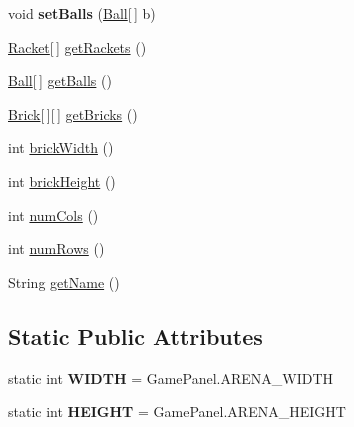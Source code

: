 \begin{DoxyCompactItemize}
\item 
\hypertarget{classbrick_breaker_1_1_level_af4d0305aa2202b4aa4d91a6b37fa262b}{
void {\bfseries setBalls} (\hyperlink{classbrick_breaker_1_1_ball}{Ball}\mbox{[}$\,$\mbox{]} b)}
\label{classbrick_breaker_1_1_level_af4d0305aa2202b4aa4d91a6b37fa262b}

\item 
\hyperlink{classbrick_breaker_1_1_racket}{Racket}\mbox{[}$\,$\mbox{]} \hyperlink{classbrick_breaker_1_1_level_abc80d5b2ae6aa9f6884dddef4a08d82b}{getRackets} ()
\item 
\hyperlink{classbrick_breaker_1_1_ball}{Ball}\mbox{[}$\,$\mbox{]} \hyperlink{classbrick_breaker_1_1_level_aabd74f57cf3043d6bae8b98953344e4b}{getBalls} ()
\item 
\hyperlink{classbrick_breaker_1_1_brick}{Brick}\mbox{[}$\,$\mbox{]}\mbox{[}$\,$\mbox{]} \hyperlink{classbrick_breaker_1_1_level_a32fa1d0bdac9b8fc1b0256b793ebeb8c}{getBricks} ()
\item 
int \hyperlink{classbrick_breaker_1_1_level_a21baab3427644fa78d1b7e98757b3609}{brickWidth} ()
\item 
int \hyperlink{classbrick_breaker_1_1_level_adf924d8f95efb086b49b5709c6b5e48e}{brickHeight} ()
\item 
int \hyperlink{classbrick_breaker_1_1_level_a3bba82793ace6907c19b5b7d21c9d0c2}{numCols} ()
\item 
int \hyperlink{classbrick_breaker_1_1_level_a87616f7c125b41d686d6c50477601200}{numRows} ()
\item 
String \hyperlink{classbrick_breaker_1_1_level_a3ef4e701ca616ff080c401586e04387b}{getName} ()
\end{DoxyCompactItemize}
\subsection*{Static Public Attributes}
\begin{DoxyCompactItemize}
\item 
\hypertarget{classbrick_breaker_1_1_level_ac206c1e0a98a683035f3e199dc993e58}{
static int {\bfseries WIDTH} = GamePanel.ARENA\_\-WIDTH}
\label{classbrick_breaker_1_1_level_ac206c1e0a98a683035f3e199dc993e58}

\item 
\hypertarget{classbrick_breaker_1_1_level_a9e137692bbe309075c83d9d8eef09655}{
static int {\bfseries HEIGHT} = GamePanel.ARENA\_\-HEIGHT}
\label{classbrick_breaker_1_1_level_a9e137692bbe309075c83d9d8eef09655}

\end{DoxyCompactItemize}


